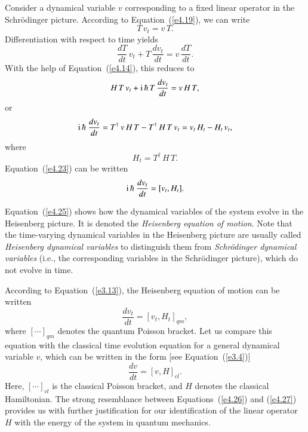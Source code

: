 Consider a dynamical variable $v$ corresponding to a fixed linear operator in
the Schr\"{o}dinger picture. According to Equation~(\ref{e4.19}), we can write
\begin{equation}
T \,v_t = v\, T.
\end{equation}
Differentiation with respect to time yields
\begin{equation}
\frac{d T}{dt} \,v_t + T \,\frac{dv_t}{dt} = v\, \frac{dT}{dt}.
\end{equation}
With the help of Equation~(\ref{e4.14}), this reduces to
\begin{equation}
H\,T\, v_t +{\rm i}\,\hbar\, T\,\frac{d v_t}{dt} = v\, H\,T,
\end{equation}
or
\begin{equation}\label{e4.23}
{\rm i}\,\hbar\ \frac{d v_t}{dt} = T^{\dag} \,v \,H\,T - T^{\dag} \,H\,T \,v_t
= v_t\, H_t - H_t\, v_t,
\end{equation}
where
\begin{equation}
H_t = T^{\dag}\, H\, T.
\end{equation}
Equation~(\ref{e4.23})
can be written
\begin{equation}\label{e4.25}
{\rm i}\,\hbar\ \frac{d v_t}{dt} = [v_t, H_t].
\end{equation}

Equation~(\ref{e4.25}) shows how the dynamical variables of the system evolve in the
Heisenberg  picture. It is denoted  the {\em Heisenberg equation of motion}. 
Note that the time-varying dynamical variables in the Heisenberg picture
are usually called {\em Heisenberg dynamical variables}\/ to distinguish them
from {\em Schr\"{o}dinger dynamical variables}\/ ({\rm i.e.}, the corresponding variables in
the Schr\"{o}dinger picture), which do not evolve in time. 

According to Equation~(\ref{e3.13}), the Heisenberg equation of motion can be written
\begin{equation}\label{e4.26}
\frac{dv_t}{dt} = [v_t, H_t]_{qm},
\end{equation}
where $[\cdots]_{qm}$ denotes the quantum Poisson bracket. 
Let us compare this equation
with the classical time evolution
equation for a general dynamical variable $v$, which can be written
in the form [see Equation~(\ref{e3.4})]
\begin{equation}\label{e4.27}
\frac{dv}{dt} = [v,H]_{cl}.
\end{equation}
Here, $[\cdots]_{cl}$ is the classical Poisson bracket, and $H$ denotes
the classical Hamiltonian. The strong resemblance between 
Equations~(\ref{e4.26}) and (\ref{e4.27}) 
provides us with further justification for our identification
of the linear operator $H$ with the energy of the system in quantum mechanics. 

